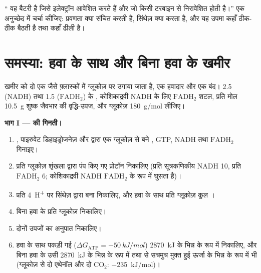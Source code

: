 \begin{exercise}[$\star\star\star$]\label{exo:b1:respiration-fermentation:12}
`` वह बैटरी है जिसे इलेक्ट्रॉन आवेशित करते हैं और जो किसी
टरबाइन से निरावेशित होती है।'' एक अनुच्छेद में चर्चा कीजिए: प्रवणता क्या
संचित करती है, सिंथेज़ क्या करता है, और यह उपमा कहाँ ठीक-ठीक बैठती है तथा
कहाँ ढीली है।
\end{exercise}

\section{समस्या: हवा के साथ और बिना हवा के खमीर}

\begin{problem}
\label{pb:b1:respiration-fermentation:1}
खमीर को दो एक जैसे फ़्लास्कों में ग्लूकोज़ पर उगाया जाता है, एक हवादार
और एक बंद। 2.5 (NADH) तथा 1.5 ($\mathrm{FADH_2}$) के ,
कोशिकाद्रवी NADH के लिए $\mathrm{FADH_2}$ शटल, प्रति मोल 
\qty{10.5}{g} शुष्क जैवभार की वृद्धि-उपज, और ग्लूकोज़
\qty{180}{g/mol} लीजिए।

\medskip
\noindent\textbf{भाग I ---  की गिनती।}
\begin{enumerate}
  \item {}, पाइरुवेट डिहाइड्रोजनेज़ और  द्वारा एक
        ग्लूकोज़ से बने , GTP, NADH तथा $\mathrm{FADH_2}$ गिनाइए।
  \item प्रति ग्लूकोज़ शृंखला द्वारा पंप किए गए प्रोटॉन निकालिए (प्रति
        सूत्रकणिकीय NADH 10, प्रति $\mathrm{FADH_2}$ 6; कोशिकाद्रवी NADH
        $\mathrm{FADH_2}$ के रूप में घुसता है)।
  \item प्रति  \qty{4}{H^+} पर सिंथेज़ द्वारा बना  निकालिए,
        और हवा के साथ प्रति ग्लूकोज़ कुल ।
  \item बिना हवा के प्रति ग्लूकोज़  निकालिए।
  \item दोनों उपजों का अनुपात निकालिए।
  \item हवा के साथ पकड़ी गई  ($\Delta G_{\text{ATP}}
        = \qty{-50}{kJ/mol}$) \qty{2870}{kJ} के भिन्न के रूप में
        निकालिए, और बिना हवा के उसी \qty{2870}{kJ} के भिन्न के रूप में
        तथा  से सचमुच मुक्त हुई ऊर्जा के भिन्न के रूप में भी
        (ग्लूकोज़ से दो एथेनॉल और दो $\mathrm{CO_2}$: \qty{-235}{kJ/mol})।
\end{enumerate}


\end{problem}
